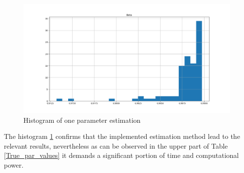 \documentclass{pracamgr}
\numberwithin{equation}{section}
\begin{document}
\begin{figure}[H] \centering
\includegraphics[width=\textwidth]{Hist_1}
\caption[Histogram of one parameter estimation]{Histogram of one parameter estimation}
\label{Hist_1}
\end{figure} 

The histogram \ref{Hist_1} confirms that the implemented estimation method lead to the relevant results, nevertheless as can be observed in the upper part of Table \ref{True_par_values} it demands a significant portion of time and computational power.
\end{document}
